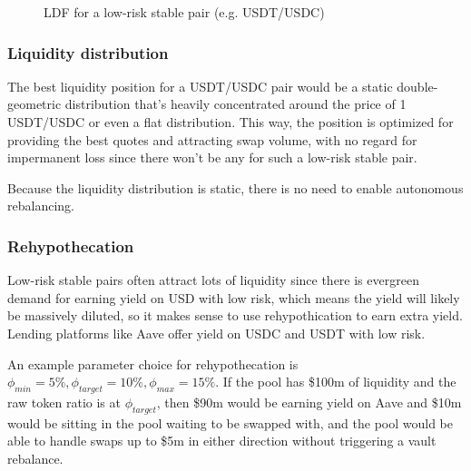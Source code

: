 \documentclass[twocolumn]{article}
\begin{document}
\begin{figure}
  \centering
  \caption{LDF for a low-risk stable pair (e.g. USDT/USDC)}
  \label{fig:low_risk_stable}
\end{figure}

\subsubsection{Liquidity distribution}

The best liquidity position for a USDT/USDC pair would be a static double-geometric distribution that's heavily concentrated around the price of 1 USDT/USDC or even a flat distribution. This way, the position is optimized for providing the best quotes and attracting swap volume, with no regard for impermanent loss since there won't be any for such a low-risk stable pair.

Because the liquidity distribution is static, there is no need to enable autonomous rebalancing.

\subsubsection{Rehypothecation}

Low-risk stable pairs often attract lots of liquidity since there is evergreen demand for earning yield on USD with low risk, which means the yield will likely be massively diluted, so it makes sense to use rehypothication to earn extra yield. Lending platforms like Aave offer yield on USDC and USDT with low risk.

An example parameter choice for rehypothecation is $\phi_{min}=5\%, \phi_{target}=10\%, \phi_{max}=15\%$. If the pool has \$100m of liquidity and the raw token ratio is at $\phi_{target}$, then \$90m would be earning yield on Aave and \$10m would be sitting in the pool waiting to be swapped with, and the pool would be able to handle swaps up to \$5m in either direction without triggering a vault rebalance.
\end{document}
